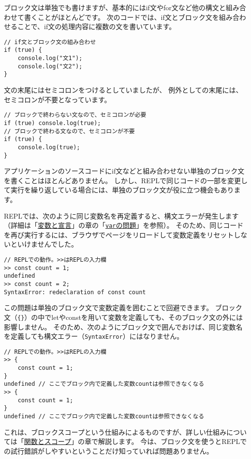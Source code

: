 ブロック文は単独でも書けますが、基本的にはif文やfor文など他の構文と組み合わせて書くことがほとんどです。
次のコードでは、if文とブロック文を組み合わせることで、if文の処理内容に複数の文を書いています。

\begin{lstlisting}
// if文とブロック文の組み合わせ
if (true) {
    console.log("文1");
    console.log("文2");
}
\end{lstlisting}

文の末尾にはセミコロンをつけるとしていましたが、
例外として\textbf{}の末尾には、セミコロンが不要となっています。

\begin{lstlisting}
// ブロックで終わらない文なので、セミコロンが必要
if (true) console.log(true);
// ブロックで終わる文なので、セミコロンが不要
if (true) {
    console.log(true);
}
\end{lstlisting}

\begin{tcolorbox}[enhanced jigsaw,breakable,title=単独のブロック文の活用]\label{isolate-block-statement}

アプリケーションのソースコードにif文などと組み合わせない単独のブロック文を書くことはほとんどありません。
しかし、REPLで同じコードの一部を変更して実行を繰り返している場合には、単独のブロック文が役に立つ機会もあります。

REPLでは、次のように同じ変数名を再定義すると、構文エラーが発生します（詳細は「\hyperlink{variable-and-declaration}{変数と宣言}」の章の「\hyperlink{var-issues}{\texttt{var}の問題}」を参照）。
そのため、同じコードを再び実行するには、ブラウザでページをリロードして変数定義をリセットしないといけませんでした。

\begin{lstlisting}
// REPLでの動作。>>はREPLの入力欄
>> const count = 1;
undefined
>> const count = 2;
SyntaxError: redeclaration of const count
\end{lstlisting}

この問題は単独のブロック文で変数定義を囲むことで回避できます。
ブロック文（\texttt{\{\}}）の中でletやconstを用いて変数を定義しても、そのブロック文の外には影響しません。
そのため、次のようにブロック文で囲んでおけば、同じ変数名を定義しても構文エラー（\texttt{SyntaxError}）にはなりません。

\begin{lstlisting}
// REPLでの動作。>>はREPLの入力欄
>> {
    const count = 1;
}
undefined // ここでブロック内で定義した変数countは参照できなくなる
>> {
    const count = 1;
}
undefined // ここでブロック内で定義した変数countは参照できなくなる
\end{lstlisting}

これは、ブロックスコープという仕組みによるものですが、詳しい仕組みについては「\hyperlink{function-and-scope}{関数とスコープ}」の章で解説します。
今は、ブロック文を使うとREPLでの試行錯誤がしやすいということだけ知っていれば問題ありません。
\end{tcolorbox}

